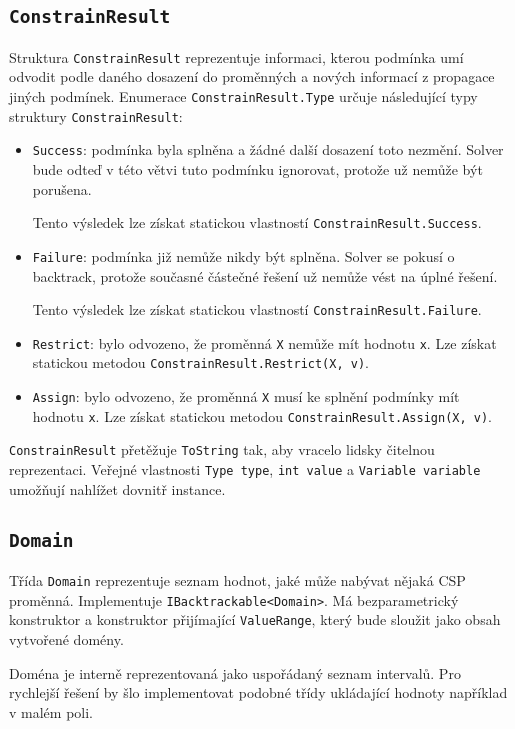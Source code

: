 \documentclass[a4paper]{article}
\begin{document}
\subsection{\texttt{ConstrainResult}}
Struktura \texttt{ConstrainResult} reprezentuje informaci, kterou podmínka umí
odvodit podle daného dosazení do proměnných a nových informací z propagace
jiných podmínek. Enumerace \texttt{ConstrainResult.Type} určuje následující typy
struktury \texttt{ConstrainResult}:
\begin{itemize}
\item
	\texttt{Success}: podmínka byla splněna a žádné další dosazení toto
	nezmění. Solver bude odteď v této větvi tuto podmínku ignorovat, protože
	už nemůže být porušena.

	Tento výsledek lze získat statickou vlastností
	\texttt{ConstrainResult.Success}.
\item
	\texttt{Failure}: podmínka již nemůže nikdy být splněna. Solver se
	pokusí o backtrack, protože současné částečné řešení už nemůže vést na
	úplné řešení.

	Tento výsledek lze získat statickou vlastností
	\texttt{ConstrainResult.Failure}.
\item
	\texttt{Restrict}: bylo odvozeno, že proměnná \texttt{X} nemůže mít
	hodnotu \texttt{x}. Lze získat statickou metodou
	\texttt{ConstrainResult.Restrict(X, v)}.
\item
	\texttt{Assign}: bylo odvozeno, že proměnná \texttt{X} musí ke splnění
	podmínky mít hodnotu \texttt{x}. Lze získat statickou metodou
	\texttt{ConstrainResult.Assign(X, v)}.
\end{itemize}
\texttt{ConstrainResult} přetěžuje \texttt{ToString} tak, aby vracelo lidsky
čitelnou reprezentaci. Veřejné vlastnosti \texttt{Type type}, \texttt{int value}
a \texttt{Variable variable} umožňují nahlížet dovnitř instance.

\subsection{\texttt{Domain}}
Třída \texttt{Domain} reprezentuje seznam hodnot, jaké může nabývat nějaká CSP
proměnná. Implementuje \texttt{IBacktrackable<Domain>}.
Má bezparametrický konstruktor a konstruktor přijímající \texttt{ValueRange},
který bude sloužit jako obsah vytvořené domény.

Doména je interně reprezentovaná jako uspořádaný seznam intervalů. Pro rychlejší
řešení by šlo implementovat podobné třídy ukládající hodnoty například v malém
poli.
\end{document}
